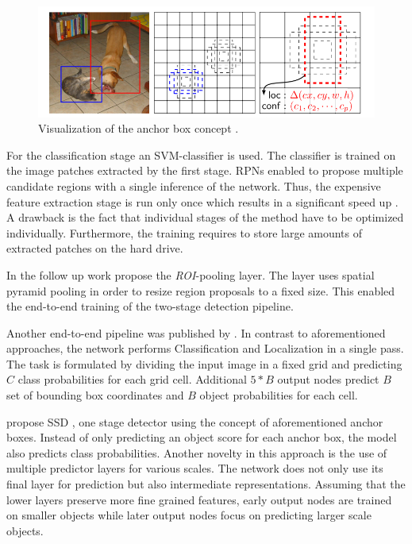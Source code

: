 \begin{figure}[hbtp]
	
	\centering
	\captionsetup{justification=raggedright,singlelinecheck=false}
	\includegraphics[width=0.8\linewidth]{fig/anchors}
	\caption{Visualization of the anchor box concept \cite{Liu}.}
	\label{fig:anchors}
	
\end{figure}

For the classification stage an \ac{SVM}-classifier is used. The classifier is trained on the image patches extracted by the first stage. \acp{RPN} enabled to propose multiple candidate regions with a single inference of the network. Thus, the expensive feature extraction stage is run only once which results in a significant speed up . A drawback is the fact that individual stages of the method have to be optimized individually. Furthermore, the training requires to store large amounts of extracted patches on the hard drive.

In the follow up work \cite{Ren} propose the \textit{ROI}-pooling layer. The layer uses spatial pyramid pooling in order to resize region proposals to a fixed size. This enabled the end-to-end training of the two-stage detection pipeline. 

Another end-to-end pipeline was published by \citeauthor{Redmon} \cite{Redmon}. In contrast to aforementioned approaches, the network performs Classification and Localization in a single pass. The task is formulated by dividing the input image in a fixed grid and predicting $C$ class probabilities for each grid cell. Additional $5*B$ output nodes predict $B$ set of bounding box coordinates and $B$ object probabilities for each cell. 

\citeauthor{Liu} propose \ac{SSD} \cite{Liu}, one stage detector using the concept of aforementioned anchor boxes. Instead of only predicting an object score for each anchor box, the model also predicts class probabilities. Another novelty in this approach is the use of multiple predictor layers for various scales. The network does not only use its final layer for prediction but also intermediate representations. Assuming that the lower layers preserve more fine grained features, early output nodes are trained on smaller objects while later output nodes focus on predicting larger scale objects.

